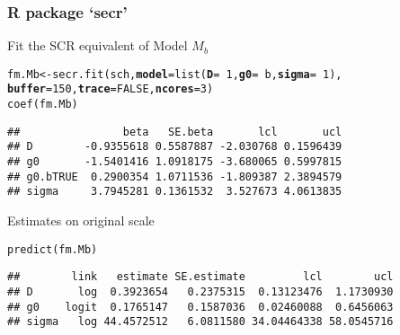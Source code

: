 \documentclass[color=usenames,dvipsnames]{beamer}\usepackage[]{graphicx}\usepackage[]{xcolor}
\makeatletter
\newcommand{\hlnum}[1]{\textcolor[rgb]{0.69,0.494,0}{#1}}%
\newcommand{\hlopt}[1]{\textcolor[rgb]{0,0,0}{#1}}%
\newcommand{\hldef}[1]{\textcolor[rgb]{0,0,0}{#1}}%
\newcommand{\hlkwb}[1]{\textcolor[rgb]{0,0.341,0.682}{#1}}%
\newcommand{\hlkwc}[1]{\textcolor[rgb]{0,0,0}{\textbf{#1}}}%
\newcommand{\hlkwd}[1]{\textcolor[rgb]{0.004,0.004,0.506}{#1}}%
\newenvironment{kframe}{%
 \def\at@end@of@kframe{}%
 \ifinner\ifhmode%
  \def\at@end@of@kframe{\end{minipage}}%
  \begin{minipage}{\columnwidth}%
 \fi\fi%
 \def\FrameCommand##1{\hskip\@totalleftmargin \hskip-\fboxsep
 \colorbox{shadecolor}{##1}\hskip-\fboxsep
     \hskip-\linewidth \hskip-\@totalleftmargin \hskip\columnwidth}%
 \MakeFramed {\advance\hsize-\width
   \@totalleftmargin\z@ \linewidth\hsize
   \@setminipage}}%
 {\par\unskip\endMakeFramed%
 \at@end@of@kframe}
\newenvironment{knitrout}{}{} %
\let\hlstd\hldef
\makeatother
\begin{document}
\begin{frame}[fragile]
  \frametitle{R package `secr'}
  Fit the SCR equivalent of Model $M_b$
\begin{knitrout}\scriptsize
{}\color{fgcolor}\begin{kframe}
\begin{alltt}
\hlstd{fm.Mb} \hlkwb{<-} \hlkwd{secr.fit}\hlstd{(sch,} \hlkwc{model}\hlstd{=}\hlkwd{list}\hlstd{(}\hlkwc{D}\hlstd{=}\hlopt{~}\hlnum{1}\hlstd{,} \hlkwc{g0}\hlstd{=}\hlopt{~}\hlstd{b,} \hlkwc{sigma}\hlstd{=}\hlopt{~}\hlnum{1}\hlstd{),}
                  \hlkwc{buffer}\hlstd{=}\hlnum{150}\hlstd{,} \hlkwc{trace}\hlstd{=}\hlnum{FALSE}\hlstd{,} \hlkwc{ncores}\hlstd{=}\hlnum{3}\hlstd{)}
\hlkwd{coef}\hlstd{(fm.Mb)}
\end{alltt}
\begin{verbatim}
##                beta   SE.beta       lcl       ucl
## D        -0.9355618 0.5587887 -2.030768 0.1596439
## g0       -1.5401416 1.0918175 -3.680065 0.5997815
## g0.bTRUE  0.2900354 1.0711536 -1.809387 2.3894579
## sigma     3.7945281 0.1361532  3.527673 4.0613835
\end{verbatim}
\end{kframe}
\end{knitrout}
\pause
\vfill
Estimates on original scale
\begin{knitrout}\scriptsize
{}\color{fgcolor}\begin{kframe}
\begin{alltt}
\hlkwd{predict}\hlstd{(fm.Mb)}
\end{alltt}
\begin{verbatim}
##        link   estimate SE.estimate         lcl        ucl
## D       log  0.3923654   0.2375315  0.13123476  1.1730930
## g0    logit  0.1765147   0.1587036  0.02460088  0.6456063
## sigma   log 44.4572512   6.0811580 34.04464338 58.0545716
\end{verbatim}
\end{kframe}
\end{knitrout}
\end{frame}
\end{document}
